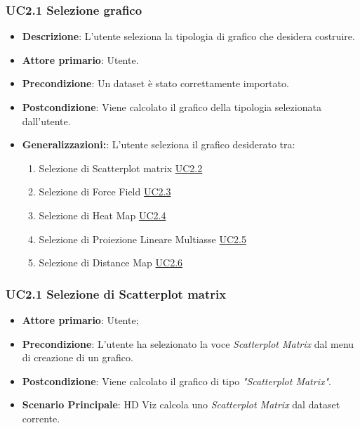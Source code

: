 \subsubsection{UC2.1 Selezione grafico}
\label{ssub:uc2.1}
\begin{itemize}

	\item \textbf{Descrizione}: L’utente seleziona la tipologia di grafico che desidera costruire.

    \item \textbf{Attore primario}: Utente.

	\item \textbf{Precondizione}:   Un dataset è stato correttamente importato. 
	
    \item \textbf{Postcondizione}:  Viene calcolato il grafico della tipologia selezionata dall'utente.

	\item \textbf{Generalizzazioni:}:  L'utente seleziona il grafico desiderato tra:

		\begin{enumerate}
			
			\item Selezione di Scatterplot matrix \hyperref[ssub:uc2.2]{UC2.2}
			\item Selezione di Force Field \hyperref[ssub:uc2.3]{UC2.3}
			\item Selezione di Heat Map \hyperref[ssub:uc2.4]{UC2.4}
			\item Selezione di Proiezione Lineare Multiasse \hyperref[ssub:uc2.5]{UC2.5}
			\item Selezione di Distance Map \hyperref[ssub:uc2.6]{UC2.6}
			
		\end{enumerate}

\end{itemize}


\subsubsection{UC2.1 Selezione di Scatterplot matrix}
\label{ssub:uc2.2}
\begin{itemize}

    \item \textbf{Attore primario}: Utente;

    \item \textbf{Precondizione}:   L'utente ha selezionato la voce \emph{Scatterplot Matrix} dal menu di creazione di un grafico.

    \item \textbf{Postcondizione}:  Viene calcolato il grafico di tipo \emph{"Scatterplot Matrix"}.

	\item \textbf{Scenario Principale}: HD Viz calcola uno \emph{Scatterplot Matrix} dal dataset corrente.
\end{itemize}


